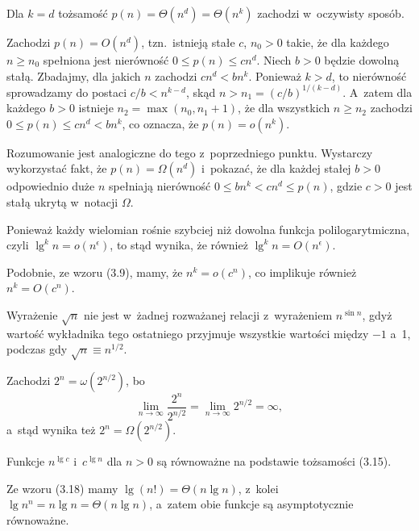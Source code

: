 \subproblem %
Dla $k=d$ tożsamość $p(n)=\Theta(n^d)=\Theta(n^k)$ zachodzi w~oczywisty sposób.

\subproblem %
Zachodzi $p(n)=O(n^d)$, tzn.\ istnieją stałe $c$, $n_0>0$ takie, że dla każdego $n\ge n_0$ spełniona jest nierówność $0\le p(n)\le cn^d$.
Niech $b>0$ będzie dowolną stałą.
Zbadajmy, dla jakich $n$ zachodzi $cn^d<bn^k$.
Ponieważ $k>d$, to nierówność sprowadzamy do postaci $c/b<n^{k-d}$, skąd $n>n_1=(c/b)^{1/(k-d)}$.
A~zatem dla każdego $b>0$ istnieje $n_2=\max(n_0,n_1+1)$, że dla wszystkich $n\ge n_2$ zachodzi $0\le p(n)\le cn^d<bn^k$, co oznacza, że $p(n)=o(n^k)$.

\subproblem %
Rozumowanie jest analogiczne do tego z~poprzedniego punktu.
Wystarczy wykorzystać fakt, że $p(n)=\Omega(n^d)$ i~pokazać, że dla każdej stałej $b>0$ odpowiednio duże $n$ spełniają nierówność $0\le bn^k<cn^d\le p(n)$, gdzie $c>0$ jest stałą ukrytą w~notacji $\Omega$.


\subproblem %
Ponieważ każdy wielomian rośnie szybciej niż dowolna funkcja polilogarytmiczna, czyli $\lg^kn=o(n^\epsilon)$, to stąd wynika, że również $\lg^kn=O(n^\epsilon)$.

\subproblem %
Podobnie, ze wzoru (3.9), mamy, że $n^k=o(c^n)$, co implikuje również $n^k=O(c^n)$.

\subproblem %
Wyrażenie $\sqrt{n}$ nie jest w~żadnej rozważanej relacji z~wyrażeniem $n^{\sin n}$, gdyż wartość wykładnika tego ostatniego przyjmuje wszystkie wartości między $-1$ a~1, podczas gdy $\sqrt{n}\equiv n^{1/2}$.

\subproblem %
Zachodzi $2^n=\omega(2^{n/2})$, bo
\[
	\lim_{n\to\infty}\frac{2^n}{2^{n/2}} = \lim_{n\to\infty}2^{n/2} = \infty,
\]
a~stąd wynika też $2^n=\Omega(2^{n/2})$.

\subproblem %
Funkcje $n^{\lg c}$ i~$c^{\lg n}$ dla $n>0$ są równoważne na podstawie tożsamości (3.15).

\subproblem %
Ze wzoru (3.18) mamy $\lg(n!)=\Theta(n\lg n)$, z~kolei $\lg n^n=n\lg n=\Theta(n\lg n)$, a~zatem obie funkcje są asymptotycznie równoważne.

